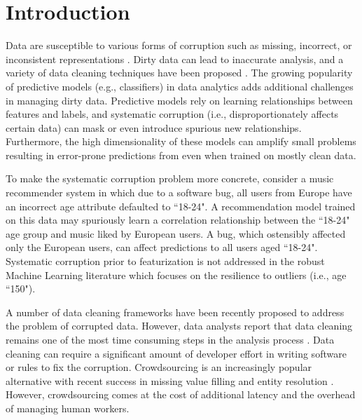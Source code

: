 \section{Introduction}
Data are susceptible to various forms of corruption such as missing, incorrect, or inconsistent representations \cite{Gartner}.
Dirty data can lead to inaccurate analysis, and a variety of data cleaning techniques have been proposed \cite{rahm2000data}.
The growing popularity of predictive models (e.g., classifiers) in data analytics \cite{bdas, alexandrov2014stratosphere, crotty2014tupleware, hellerstein2012madlib} adds additional challenges in managing dirty data.
Predictive models rely on learning relationships between features and labels, and systematic corruption \cite{taylor1982introduction} (i.e., disproportionately affects certain data) can mask or even introduce spurious new relationships.
Furthermore, the high dimensionality of these models can amplify small problems \cite{xiaofeature} resulting in error-prone predictions from even when trained on mostly clean data.

To make the systematic corruption problem more concrete, consider a music recommender system in which due to a software bug, all users from Europe have an incorrect age attribute defaulted to ``18-24".
A recommendation model trained on this data may spuriously learn a correlation relationship between the ``18-24" age group and music liked by European users.
A bug, which ostensibly affected only the European users, can affect predictions to all users aged ``18-24".
Systematic corruption prior to featurization is not addressed in the robust Machine Learning literature which focuses on the resilience to outliers (i.e., age ``150").

A number of data cleaning frameworks have been recently proposed \cite{khayyat2015bigdansing, chu2015katara, sampleclean} to address the problem of corrupted data.
However, data analysts report that data cleaning remains one of the most time consuming steps in the analysis process \cite{nytimes}.
Data cleaning can require a significant amount of developer effort in writing software or rules to fix the corruption.
Crowdsourcing is an increasingly popular alternative with recent success in missing value filling and entity resolution \cite{gokhale2014corleone, park2014crowdfill, sampleclean,chu2015katara}.
However, crowdsourcing comes at the cost of additional latency and the overhead of managing human workers.

